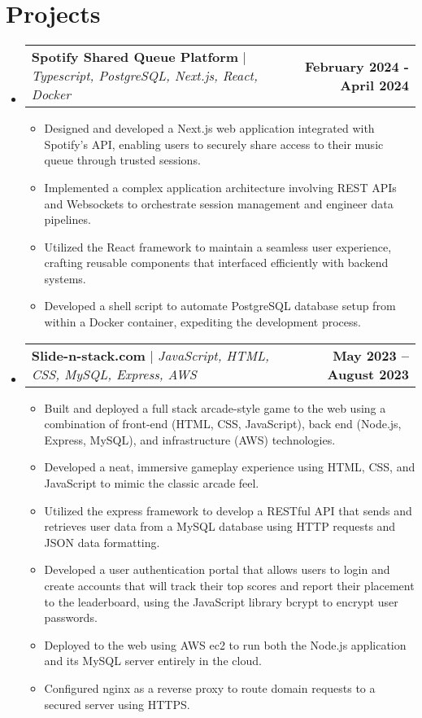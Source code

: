 \documentclass[letterpaper,11pt]{article}
\makeatletter
\newcommand{\resumeItem}[1]{
  \item\small{
    {#1 \vspace{-2pt}}
  }
}
\newcommand{\resumeProjectHeading}[2]{
    \item
    \begin{tabular*}{1.001\textwidth}{l@{\extracolsep{\fill}}r}
      \small#1 & \textbf{\small #2}\\
    \end{tabular*}\vspace{-7pt}
}
\newcommand{\resumeSubHeadingListStart}{\begin{itemize}[leftmargin=0.0in, label={}]}
\newcommand{\resumeSubHeadingListEnd}{\end{itemize}}
\newcommand{\resumeItemListStart}{\begin{itemize}}
\newcommand{\resumeItemListEnd}{\end{itemize}\vspace{-5pt}}
\makeatother
\begin{document}
\section{Projects}
    \vspace{-5pt}
    \resumeSubHeadingListStart
      \resumeProjectHeading
          {\textbf{Spotify Shared Queue Platform} $|$ \emph{Typescript, PostgreSQL, Next.js, React, Docker}}{February 2024 - April 2024}
          \resumeItemListStart
            \resumeItem{Designed and developed a Next.js web application integrated with Spotify's API, enabling users to securely share access to their music queue through trusted sessions.}
            \resumeItem{Implemented a complex application architecture involving REST APIs and Websockets to orchestrate session management and engineer data pipelines.}
            \resumeItem{Utilized the React framework to maintain a seamless user experience, crafting reusable components that interfaced efficiently with backend systems.}
            \resumeItem {Developed a shell script to automate PostgreSQL database setup from within a Docker container, expediting the development process.}
          \resumeItemListEnd
          \vspace{-13pt}
      \resumeProjectHeading
          {\textbf{Slide-n-stack.com} $|$ \emph{JavaScript, HTML, CSS, MySQL, Express, AWS}}{May 2023 -- August 2023}
          \resumeItemListStart
            \resumeItem{Built and deployed a full stack arcade-style game to the web using a combination of front-end (HTML, CSS, JavaScript), back end (Node.js, Express, MySQL), and infrastructure (AWS) technologies.}
            \resumeItem{Developed a neat, immersive gameplay experience using HTML, CSS, and JavaScript to mimic the classic arcade feel.}
            \resumeItem{Utilized the express framework to develop a RESTful API that sends and retrieves user data from a MySQL database using HTTP requests and JSON data formatting.}
            \resumeItem{Developed a user authentication portal that allows users to login and create accounts that will track their top scores and report their placement to the leaderboard, using the JavaScript library bcrypt to encrypt user passwords.}
            \resumeItem{Deployed to the web using AWS ec2 to run both the Node.js application and its MySQL server entirely in the cloud.}
            \resumeItem{Configured nginx as a reverse proxy to route domain requests to a secured server using HTTPS.}
          \resumeItemListEnd
          \vspace{-13pt}
    \resumeSubHeadingListEnd
\vspace{-15pt}
\end{document}
